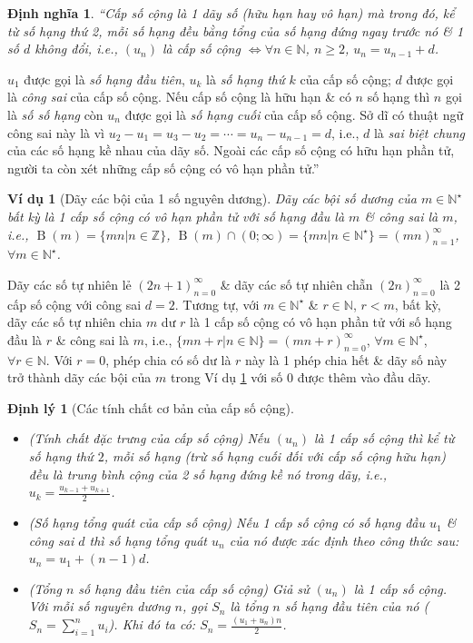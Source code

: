 \documentclass[oneside]{book}
\numberwithin{equation}{section}
\newtheorem{dinhnghia}{Định nghĩa}[section]
\newtheorem{vidu}{Ví dụ}[section]
\newtheorem{dinhly}{Định lý}[section]
\begin{document}
\begin{dinhnghia}
	``\emph{Cấp số cộng} là 1 dãy số (hữu hạn hay vô hạn) mà trong đó, kể từ số hạng thứ 2, mỗi số hạng đều bằng tổng của số hạng đứng ngay trước nó \& 1 số $d$ không đổi, i.e., $(u_n)$ là cấp số cộng $\Leftrightarrow\forall n\in\mathbb{N}$, $n\ge 2$, $u_n = u_{n-1} + d$.
\end{dinhnghia}
$u_1$ được gọi là \textit{số hạng đầu tiên}, $u_k$ là \textit{số hạng thứ $k$} của cấp số cộng; $d$ được gọi là \textit{công sai} của cấp số cộng. Nếu cấp số cộng là hữu hạn \& có $n$ số hạng thì $n$ gọi là \textit{số số hạng} còn $u_n$ được gọi là \textit{số hạng cuối} của cấp số cộng. Sở dĩ có thuật ngữ công sai này là vì $u_2 - u_1 = u_3 - u_2 = \cdots = u_n - u_{n-1} = d$, i.e., $d$ là \textit{sai biệt chung} của các số hạng kề nhau của dãy số. Ngoài các cấp số cộng có hữu hạn phần tử, người ta còn xét những cấp số cộng có vô hạn phần tử.''

\begin{vidu}[Dãy các bội của 1 số nguyên dương]
	\label{vidu:day boi cua 1 so nguyen duong}
	Dãy các bội số dương của $m\in\mathbb{N}^\star$ bất kỳ là 1 cấp số cộng có vô hạn phần tử với số hạng đầu là $m$ \& công sai là $m$, i.e., $\operatorname{B}(m) = \{mn|n\in\mathbb{Z}\}$, $\operatorname{B}(m)\cap(0;\infty) = \{mn|n\in\mathbb{N}^\star\} = (mn)_{n=1}^\infty$, $\forall m\in\mathbb{N}^\star$.
\end{vidu}
Dãy các số tự nhiên lẻ $(2n + 1)_{n=0}^\infty$ \& dãy các số tự nhiên chẵn $(2n)_{n=0}^\infty$ là 2 cấp số cộng với công sai $d = 2$. Tương tự, với $m\in\mathbb{N}^\star$ \& $r\in\mathbb{N}$, $r < m$, bất kỳ, dãy các số tự nhiên chia $m$ dư $r$ là 1 cấp số cộng có vô hạn phần tử với số hạng đầu là $r$ \& công sai là $m$, i.e., $\{mn + r|n\in\mathbb{N}\} = (mn + r)_{n=0}^\infty$, $\forall m\in\mathbb{N}^\star$, $\forall r\in\mathbb{N}$. Với $r = 0$, phép chia có số dư là $r$ này là 1 phép chia hết \& dãy số này trở thành dãy các bội của $m$ trong Ví dụ \ref{vidu:day boi cua 1 so nguyen duong} với số $0$ được thêm vào đầu dãy.

\begin{dinhly}[Các tính chất cơ bản của cấp số cộng]
	\begin{itemize}
		\item[(a)] \emph{(Tính chất đặc trưng của cấp số cộng)} Nếu $(u_n)$ là 1 cấp số cộng thì kể từ số hạng thứ $2$, mỗi số hạng (trừ số hạng cuối đối với cấp số cộng hữu hạn) đều là trung bình cộng của 2 số hạng đứng kề nó trong dãy, i.e., $u_k = \frac{u_{k-1} + u_{k+1}}{2}$.
		\item[(b)] \emph{(Số hạng tổng quát của cấp số cộng)} Nếu 1 cấp số cộng có số hạng đầu $u_1$ \& công sai $d$ thì số hạng tổng quát $u_n$ của nó được xác định theo công thức sau: $u_n = u_1 + (n - 1)d$.
		\item[(c)] \emph{(Tổng $n$ số hạng đầu tiên của cấp số cộng)} Giả sử $(u_n)$ là 1 cấp số cộng. Với mỗi số nguyên dương $n$, gọi $S_n$ là tổng $n$ số hạng đầu tiên của nó ($S_n = \sum_{i=1}^n u_i$). Khi đó ta có: $S_n = \frac{(u_1 + u_n)n}{2}$.
	\end{itemize}
\end{dinhly}
\end{document}
